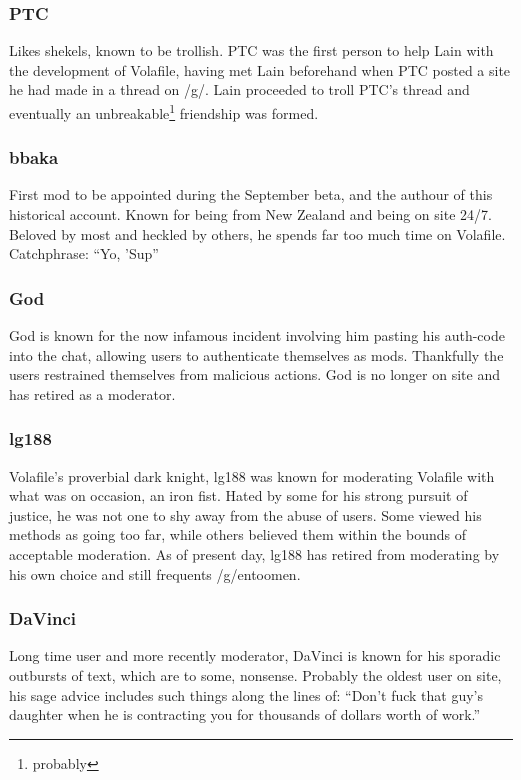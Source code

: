 \documentclass[12pt]{report}
\begin{document}
{	
\subsubsection{PTC}
	Likes shekels, known to be trollish. PTC was the first person to help Lain with the development of Volafile, having met Lain beforehand when PTC posted a site he had made in a thread on /g/. Lain proceeded to troll PTC's thread and eventually an unbreakable\footnote{probably} friendship was formed.
	
	
\subsubsection{bbaka}
	First mod to be appointed during the September beta, and the authour of this historical account. Known for being from New Zealand and being on site 24/7. Beloved by most and heckled by others, he spends far too much time on Volafile.
	Catchphrase: ``Yo, 'Sup''
	
\subsubsection{God}
	God is known for the now infamous incident involving him pasting his auth-code into the chat, allowing users to authenticate themselves as mods. Thankfully the users restrained themselves from malicious actions. God is no longer on site and has retired as a moderator.
	
	 
\subsubsection{lg188}
Volafile's proverbial dark knight, lg188 was known for moderating Volafile with what was on occasion, an iron fist. Hated by some for his strong pursuit of justice, he was not one to shy away from the abuse of users. Some viewed his methods as going too far, while others believed them within the bounds of acceptable moderation. As of present day, lg188 has retired from moderating by his own choice and still frequents /g/entoomen.
	
\subsubsection{DaVinci}
	Long time user and more recently moderator, DaVinci is known for his sporadic outbursts of text, which are to some, nonsense. Probably the oldest user on site, his sage advice includes such things along the lines of: ``Don't fuck that guy's daughter when he is contracting you for thousands of dollars worth of work.'' 
\vfill
\pagebreak
}
\end{document}
